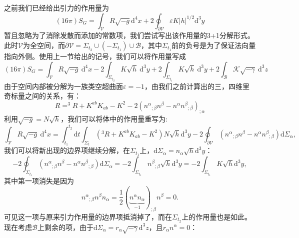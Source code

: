 \documentclass[hyperref, UTF8, a4paper]{ctexart}
\begin{document}
之前我们已经给出引力的作用量为
\begin{equation*}
	( 16\pi ) S_{G} =\int _{\mathscr{V}} R\sqrt{-g}\mathrm{d}^{4} x+2\oint _{\partial \mathscr{V}} \varepsilon K| h| ^{1/2}\mathrm{d}^{3} y
\end{equation*}
暂且忽略为了消除发散而添加的常数项，我们尝试写出该作用量的3+1分解形式。此时$\mathscr{V}$为全空间，而$\partial \mathscr{V} =\Sigma _{t_{2}} \cup (-\Sigma _{t_{1}} )\cup \mathscr{B}$，其中$\Sigma _{t_{1}}$前的负号是为了保证法向量指向外侧。使用上一节给出的记号，我们可以将作用量写成
\begin{equation*}
	(16\pi )S_{G} =\int _{\mathscr{V}} R\sqrt{-g} \ \mathrm{d}^{4} x-2\int _{\Sigma _{t_{2}}} K\sqrt{h} \ \mathrm{d}^{3} y+2\int _{\Sigma _{t_{1}}} K\sqrt{h} \ \mathrm{d}^{3} y+2\int _{\mathscr{B}}\mathscr{K}\sqrt{-\gamma } \ \mathrm{d}^{3} z
\end{equation*}
由于空间内部被分解为一族类空超曲面$\varepsilon =-1$，由我们之前计算出的三，四维里奇标量之间的关系，有：
\begin{equation*}
	R=^{3} R+K^{ab} K_{ab} -K^{2} -2(n^{\alpha }{}_{;\beta } n^{\beta } -n^{\alpha } n^{\beta }{}_{;\beta } )_{;\alpha }
\end{equation*}
利用$\sqrt{-g} =N\sqrt{h}$，我们可以将体中的作用量重写为:
\begin{equation*}
	\int _{\mathscr{V}} R\sqrt{-g} \ \mathrm{d}^{4} x=\int _{t_{1}}^{t_{2}}\mathrm{d} t\int _{\Sigma _{t}} (^{3} R+K^{ab} K_{ab} -K^{2} )N\sqrt{h}\mathrm{d}^{3} y-2\oint _{\partial \mathscr{V}} (n^{\alpha }{}_{;\beta } n^{\beta } -n^{\alpha } n^{\beta }{}_{;\beta } )\mathrm{d} \Sigma _{\alpha } ,
\end{equation*}
我们可以将新出现的边界项继续分解，在$\Sigma _{t_{1}}$上，$\mathrm{d} \Sigma _{\alpha } =n_{\alpha }\sqrt{h}\mathrm{d}^{3} y$：
\begin{equation*}
	-2\oint _{\Sigma _{t_{1}}} (n^{\alpha }{}_{;\beta } n^{\beta } -n^{\alpha } n^{\beta }{}_{;\beta } )\mathrm{d} \Sigma _{\alpha } =-2\int _{\Sigma _{t_{1}}} n^{\beta }{}_{;\beta }\sqrt{h}\mathrm{d}^{3} y=-2\int _{\Sigma _{t_{1}}} K\sqrt{h}\mathrm{d}^{3} y,
\end{equation*}
其中第一项消失是因为
\begin{equation*}
	n^{\alpha }{}_{;\beta } n^{\beta } n_{\alpha } =\frac{1}{2} (\underbrace{n^{\alpha } n_{\alpha }}_{-1} )_{;\beta } n^{\beta } =0.
\end{equation*}
可见这一项与原来引力作用量的边界项抵消掉了，而在$\Sigma _{t_{2}}$上的作用量也是如此。现在考虑$\mathscr{B}$上剩余的项，由于$\mathrm{d} \Sigma _{\alpha } =r_{\alpha }\sqrt{-\gamma }\mathrm{d}^{3} z$，且$r_{\alpha } n^{\alpha } =0$：
\end{document}
